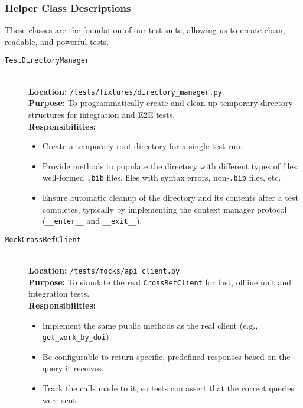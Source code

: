\documentclass[11pt, a4paper]{article}
\begin{document}
\subsubsection{Helper Class Descriptions}
These classes are the foundation of our test suite, allowing us to create clean, readable, and powerful tests.

\begin{description}
    \item[\texttt{TestDirectoryManager}] \hfill \\
    \textbf{Location:} \texttt{/tests/fixtures/directory\_manager.py} \\
    \textbf{Purpose:} To programmatically create and clean up temporary directory structures for integration and E2E tests. \\
    \textbf{Responsibilities:}
    \begin{itemize}[leftmargin=*]
        \item Create a temporary root directory for a single test run.
        \item Provide methods to populate the directory with different types of files: well-formed \texttt{.bib} files, files with syntax errors, non-\texttt{.bib} files, etc.
        \item Ensure automatic cleanup of the directory and its contents after a test completes, typically by implementing the context manager protocol (\texttt{\_\_enter\_\_} and \texttt{\_\_exit\_\_}).
    \end{itemize}

    \item[\texttt{MockCrossRefClient}] \hfill \\
    \textbf{Location:} \texttt{/tests/mocks/api\_client.py} \\
    \textbf{Purpose:} To simulate the real \texttt{CrossRefClient} for fast, offline unit and integration tests. \\
    \textbf{Responsibilities:}
    \begin{itemize}[leftmargin=*]
        \item Implement the same public methods as the real client (e.g., \texttt{get\_work\_by\_doi}).
        \item Be configurable to return specific, predefined responses based on the query it receives.
        \item Track the calls made to it, so tests can assert that the correct queries were sent.
    \end{itemize}


\end{description}
\end{document}
